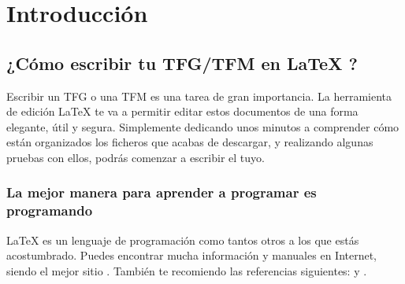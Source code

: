 
\chapter{Introducción} 

\section{¿Cómo escribir tu TFG/TFM en \LaTeX{} ?}
Escribir un \ac{TFG} o una \ac{TFM} es una tarea de gran importancia. La herramienta de edición \LaTeX{} te va a permitir editar estos documentos de una forma elegante, útil y segura. Simplemente dedicando unos minutos a comprender cómo están organizados los ficheros que acabas de descargar, y realizando algunas pruebas con ellos, podrás comenzar a escribir el tuyo.

\subsection{La mejor manera para aprender a programar es programando}
\LaTeX{} es un lenguaje de programación como tantos otros a los que estás acostumbrado. Puedes encontrar mucha información y manuales en Internet, siendo el mejor sitio \cite{LatexWiki}. También te recomiendo las referencias siguientes: \cite{Latex1} y \cite{Latex2}.

